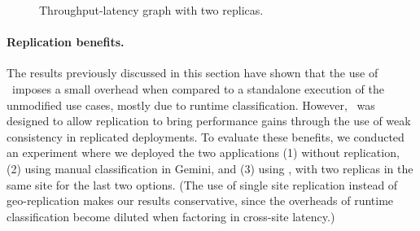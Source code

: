 \begin{figure}[t!]
\centering
{}
\par\bigskip
{}
\caption{Throughput-latency graph with two replicas.}
\label{fig:evalThputLatency}
\end{figure}

\paragraph{Replication benefits.}
The results previously discussed in this section have shown that the
use of \tool\ imposes a small overhead when compared to a standalone
execution of the unmodified use cases, mostly due to runtime
classification. However, \tool\ was designed to allow replication to
bring performance gains through the use of weak consistency in
replicated deployments. To evaluate these benefits, we conducted an
experiment where we deployed the two applications (1) without
replication, (2) using manual classification in Gemini, and (3)
using \tool, with two replicas in the same site for the last two
options. (The use of single site replication instead of
geo-replication makes our results conservative, since the overheads of
runtime classification become diluted when factoring in cross-site
latency.) 

